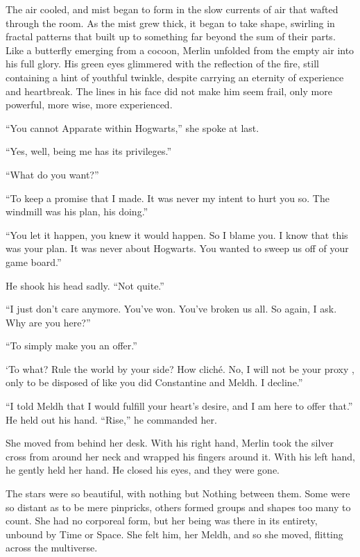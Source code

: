 The air cooled, and mist began to form in the slow currents of air that wafted through the room. As the mist grew thick, it began to take shape, swirling in fractal patterns that built up to something far beyond the sum of their parts. Like a butterfly emerging from a cocoon, Merlin unfolded from the empty air into his full glory. His green eyes glimmered with the reflection of the fire, still containing a hint of youthful twinkle, despite carrying an eternity of experience and heartbreak. The lines in his face did not make him seem frail, only more powerful, more wise, more experienced.

“You cannot Apparate within Hogwarts,” she spoke at last.

“Yes, well, being me has its privileges.”

“What do you want?”

“To keep a promise that I made. It was never my intent to hurt you so. The windmill was his plan, his doing.”

“You let it happen, you knew it would happen. So I blame you. I know that this was your plan. It was never about Hogwarts. You wanted to sweep us off of your game board.”

He shook his head sadly. “Not quite.”

“I just don’t care anymore. You’ve won. You’ve broken us all. So again, I ask. Why are you here?”

“To simply make you an offer.”

‘To what? Rule the world by your side? How cliché. No, I will not be your proxy , only to be disposed of like you did Constantine and Meldh. I decline.”

“I told Meldh that I would fulfill your heart’s desire, and I am here to offer that.” He held out his hand. “Rise,” he commanded her.

She moved from behind her desk. With his right hand, Merlin took the silver cross from around her neck and wrapped his fingers around it. With his left hand, he gently held her hand. He closed his eyes, and they were gone.

\simpleline
{}
The stars were so beautiful, with nothing but Nothing between them. Some were so distant as to be mere pinpricks, others formed groups and shapes too many to count. She had no corporeal form, but her being was there in its entirety, unbound by Time or Space. She felt him, her Meldh, and so she moved, flitting across the multiverse.

